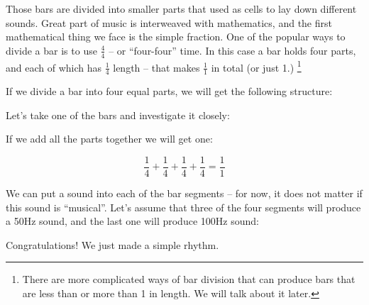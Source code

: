 \documentclass[../sparc.tex]{subfiles}
\begin{document}
Those bars are divided into smaller parts that used as cells to lay down
different sounds.  Great part of music is interweaved with mathematics, and the
first mathematical thing we face is the simple fraction.  One of the popular
ways to divide a bar is to use $\frac{4}{4}$ -- or ``four-four'' time.  In this
case a bar holds four parts, and each of which has $\frac{1}{4}$ length -- that
makes $\frac{1}{1}$ in total (or just 1.)  \footnote{There are more complicated
ways of bar division that can produce bars that are less than or more than 1 in
length.  We will talk about it later.}

If we divide a bar into four equal parts, we will get the following structure:


Let's take one of the bars and investigate it closely:


If we add all the parts together we will get one:

\begin{equation}
  \frac{1}{4} + \frac{1}{4} + \frac{1}{4} + \frac{1}{4} = \frac{1}{1}
\end{equation}

We can put a sound into each of the bar segments -- for now, it does not matter
if this sound is ``musical''.  Let's assume that three of the four segments will
produce a 50\gls{Hz} sound, and the last one will produce 100Hz sound:


Congratulations!  We just made a simple rhythm.
\end{document}
